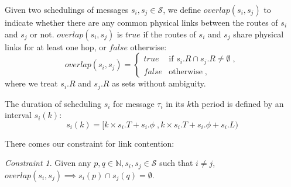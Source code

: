 \documentclass[journal]{IEEEtran}
\newcommand{\calS}{\mathcal{S}}
\theoremstyle{remark}
\newtheorem{constraint}{Constraint}
\begin{document}
Given two schedulings of messages $s_i,s_j\in\calS$,
we define $overlap(s_i,s_j)$ to indicate whether there are any common
physical links between the routes of $s_i$ and $s_j$ or not.
$overlap(s_i,s_j)$ is $true$ if the routes of $s_i$ and $s_j$ share
physical links for at least one hop, or $false$ otherwise:
\begin{equation}
\label{e:overlap}
overlap(s_i,s_j)= 
\begin{cases}
  true &\mbox{if } s_i.R \cap s_j.R \neq \emptyset \; ,\\
  false & \mbox{otherwise}\; ,
\end{cases}
\end{equation}
where we treat $s_i.R$ and $s_j.R$ as sets without ambiguity.

The duration of scheduling $s_i$ for message $\tau_i$ in its $k$th
period is defined by an interval $s_i(k)$:
\begin{equation}
\label{e:duration}
s_i(k) = [k\times s_i.T+s_i.\phi \; , k\times s_i.T+s_i.\phi+s_i.L)
\end{equation}

There comes our constraint for link contention:
\begin{constraint}
\label{c:link}
  Given any $p,q\in\mathbb{N}, s_i,s_j \in \calS$ such that $i\neq j$, 
  $overlap(s_i,s_j) \implies s_i(p) \cap s_j(q) = \emptyset$.
\end{constraint}
\end{document}
